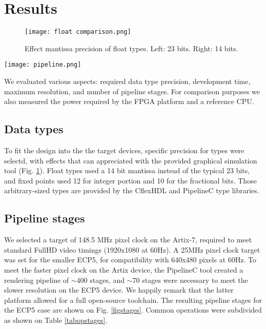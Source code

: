 \documentclass[conference]{IEEEtran}
\begin{document}
\section{Results}

\begin{figure}
\texttt{[image: float comparison.png]}
\caption{Effect mantissa precision of float types. Left: 23 bits. Right: 14 bits.}
\label{figprec}
\end{figure}

\begin{figure*}
\texttt{[image: pipeline.png]}
\caption{Resulting pipeline for the ECP5 target.}
\label{figstages}
\end{figure*}

We evaluated various aspects: required data type precision, development time, maximum resolution, and number of pipeline stages. For comparison purposes we also measured the power required by the FPGA platform and a reference CPU.

\subsection{Data types}

To fit the design into the the target devices, specific precision for types were selectd, with effects that can appreciated with the provided graphical simulation tool (Fig. \ref{figprec}). Float types used a 14 bit mantissa instead of the typical 23 bits, and fixed points used 12 for integer portion and 10 for the fractional bits. Those arbitrary-sized types are provided by the CflexHDL and PipelineC type libraries. 

\subsection{Pipeline stages}

We selected a target of 148.5 MHz pixel clock on the Artix-7, required to meet standard FullHD video timings (1920x1080 at 60Hz). A 25MHz pixel clock target was set for the smaller ECP5, for compatibility with 640x480 pixels at 60Hz.
To meet the faster pixel clock on the Artix device, the PipelineC tool created a rendering pipeline of $\sim$400 stages, and $\sim$70 stages were necessary to meet the slower resolution on the ECP5 device. We happily remark that the latter platform allowed for a full open-source toolchain. The resulting pipeline stages for the ECP5 case are shown on Fig. \ref{figstages}. Common operations were subdivided as shown on Table \ref{tabopstages}.
\end{document}
